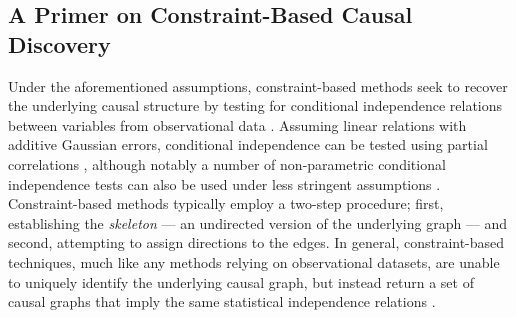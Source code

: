 \documentclass[twoside, 11pt]{article}
\makeatletter
\newcommand*{\indep}{%
  \mathbin{%
    \mathpalette{\@indep}{}%
  }%
}
\newcommand*{\@indep}[2]{%
  \sbox0{$#1\perp\m@th$}%
  \sbox2{$#1=$}%
  \sbox4{$#1\vcenter{}$}%
  \rlap{\copy0}%
  \dimen@=\dimexpr\ht2-\ht4-.2pt\relax
  \kern\dimen@
  \ifx\\#2\\%
  \else
    \hbox to \wd2{\hss$#1#2\m@th$\hss}%
    \kern-\wd2 %
  \fi
  \kern\dimen@
  \copy0 %
}
\makeatother
\begin{document}


 


\subsection{A Primer on Constraint-Based Causal Discovery} \label{primer}
Under the aforementioned assumptions, constraint-based methods seek to recover the underlying causal structure by testing for conditional independence relations between variables from observational data \citep{scheines_tetrad_1998, peters_elements_2017, pearl_probabilistic_1988}. Assuming linear relations with additive Gaussian errors, conditional independence can be tested using partial correlations \citep{lawrance_conditional_1976}, although notably a number of non-parametric conditional independence tests can also be used under less stringent assumptions \citep{li_fan2020, huang_sun_white_2016}. Constraint-based methods typically employ a two-step procedure; first, establishing the \textit{skeleton} --- an undirected version of the underlying graph --- and second, attempting to assign directions to the edges. In general, constraint-based techniques, much like any methods relying on observational datasets, are unable to uniquely identify the underlying causal graph, but instead return a set of causal graphs that imply the same statistical independence relations \citep{spirtes2000}.
\end{document}
